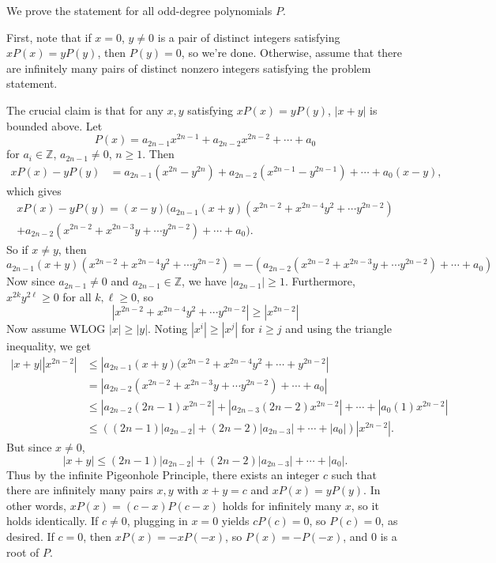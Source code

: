 \begin{solution}[name={Solution by pi37}]
	We prove the statement for all odd-degree polynomials $P$.
	
	First, note that if $x=0$, $y\neq0$ is a pair of distinct integers satisfying $xP(x)=yP(y)$, then $P(y)=0$, so we're done. Otherwise, assume that there are infinitely many pairs of distinct nonzero integers satisfying the problem statement.
	
	The crucial claim is that for any $x,y$ satisfying $xP(x)=yP(y)$, $|x+y|$ is bounded above. Let
	\[
	P(x)=a_{2n-1}x^{2n-1}+a_{2n-2}x^{2n-2}+\cdots + a_0
	\]for $a_i\in \mathbb{Z}$, $a_{2n-1}\neq 0$, $n\ge 1$. Then
	\begin{align*}
		xP(x)-yP(y)&=a_{2n-1}(x^{2n}-y^{2n})+a_{2n-2}(x^{2n-1}-y^{2n-1})+\cdots + a_0(x-y),
	\end{align*}
	which gives
	\begin{multline*}
		xP(x)-yP(y)=(x-y)(a_{2n-1}(x+y)(x^{2n-2}+x^{2n-4}y^2+\cdots y^{2n-2}) \\ +a_{2n-2}(x^{2n-2}+x^{2n-3}y+\cdots y^{2n-2})+\cdots + a_0).
	\end{multline*}
	So if $x\neq y$, then
	\[
	a_{2n-1}(x+y)(x^{2n-2}+x^{2n-4}y^2+\cdots y^{2n-2})=-(a_{2n-2}(x^{2n-2}+x^{2n-3}y+\cdots y^{2n-2})+\cdots + a_0)
	\]Now since $a_{2n-1}\neq 0$ and $a_{2n-1}\in \mathbb{Z}$, we have $|a_{2n-1}|\ge 1$. Furthermore, $x^{2k}y^{2\ell}\ge 0$ for all $k,\ell \ge 0$, so
	\[
	|x^{2n-2}+x^{2n-4}y^2+\cdots y^{2n-2}|\ge |x^{2n-2}|
	\]Now assume WLOG $|x|\ge |y|$. Noting $|x^i|\ge |x^j|$ for $i\ge j$ and using the triangle inequality, we get
	\begin{align*}
		|x+y||x^{2n-2}|&\le |a_{2n-1}(x+y)(x^{2n-2}+x^{2n-4}y^2+\cdots + y^{2n-2}|\\
		&=|a_{2n-2}(x^{2n-2}+x^{2n-3}y+\cdots y^{2n-2})+\cdots + a_0|\\
		&\le |a_{2n-2}(2n-1)x^{2n-2}|+|a_{2n-3}(2n-2)x^{2n-2}|+\cdots+|a_0(1)x^{2n-2}|\\
		&\le ((2n-1)|a_{2n-2}|+(2n-2)|a_{2n-3}|+\cdots + |a_0|)|x^{2n-2}|.
	\end{align*}But since $x\neq 0$,
	\[
	|x+y|\le (2n-1)|a_{2n-2}|+(2n-2)|a_{2n-3}|+\cdots + |a_0|.
	\]Thus by the infinite Pigeonhole Principle, there exists an integer $c$ such that there are infinitely many pairs $x,y$ with $x+y=c$ and $xP(x)=yP(y)$. In other words, $xP(x)=(c-x)P(c-x)$ holds for infinitely many $x$, so it holds identically.	If $c\neq 0$, plugging in $x=0$ yields $cP(c)=0$, so $P(c)=0$, as desired. If $c=0$, then $xP(x)=-xP(-x)$, so $P(x)=-P(-x)$, and $0$ is a root of $P$.
\end{solution}





